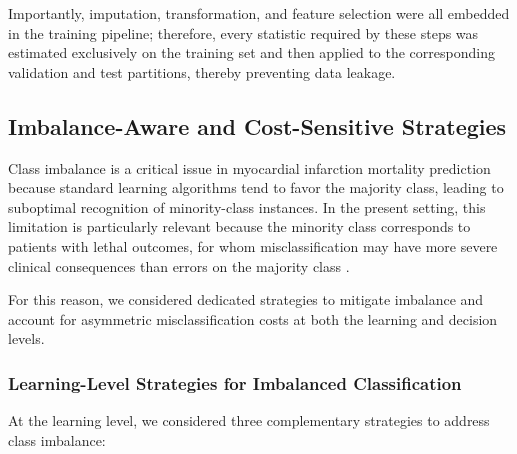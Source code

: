 \documentclass[conference]{IEEEtran}
\begin{document}
Importantly, imputation, transformation, and feature selection were all embedded in the training pipeline; therefore, every statistic required by these steps was estimated exclusively on the training set and then applied to the corresponding validation and test partitions, thereby preventing data leakage.

\subsection{Imbalance-Aware and Cost-Sensitive Strategies}
Class imbalance is a critical issue in myocardial infarction mortality prediction because standard learning algorithms tend to favor the majority class, leading to suboptimal recognition of minority-class instances. In the present setting, this limitation is particularly relevant because the minority class corresponds to patients with lethal outcomes, for whom misclassification may have more severe clinical consequences than errors on the majority class \cite{Araf2024}.

For this reason, we considered dedicated strategies to mitigate imbalance and account for asymmetric misclassification costs at both the learning and decision levels.

\subsubsection{Learning-Level Strategies for Imbalanced Classification}

At the learning level, we considered three complementary strategies to address class imbalance:
\end{document}
